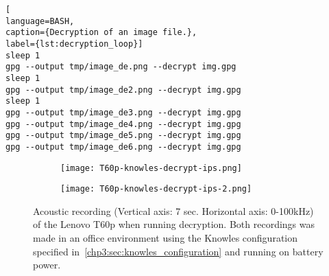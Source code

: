 \begin{lstlisting}[
language=BASH, 
caption={Decryption of an image file.}, 
label={lst:decryption_loop}]
sleep 1             
gpg --output tmp/image_de.png --decrypt img.gpg
sleep 1
gpg --output tmp/image_de2.png --decrypt img.gpg
sleep 1
gpg --output tmp/image_de3.png --decrypt img.gpg
gpg --output tmp/image_de4.png --decrypt img.gpg    
gpg --output tmp/image_de5.png --decrypt img.gpg
gpg --output tmp/image_de6.png --decrypt img.gpg
\end{lstlisting}

\begin{figure}[ht]
    \begin{subfigure}{0.5\textwidth}
        \centering
        \texttt{[image: T60p-knowles-decrypt-ips.png]}
        \caption{}
        \label{fig:T60p-knowles-decrypt-ips}
    \end{subfigure}
    \begin{subfigure}{0.5\textwidth}
        \centering
        \texttt{[image: T60p-knowles-decrypt-ips-2.png]}
        \caption{}
        \label{fig:T60p-knowles-decrypt-ips-2}
    \end{subfigure}
    \caption{Acoustic recording (Vertical axis: 7 sec. Horizontal axis: 0-100kHz) of the Lenovo T60p when running decryption.
    Both recordings was made in an office environment using the Knowles configuration specified in~\autoref{chp3:sec:knowles_configuration} and running on battery power. }
    \label{fig:T60p-knowles-decrypt-ips}
\end{figure}

